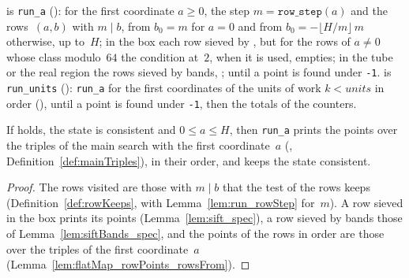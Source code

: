 \begin{definition}\label{def:runA}
  \leanok
   is \texttt{run\_a} (): for the first
  coordinate $a \ge 0$, the step $m = \texttt{row\_step}(a)$ and the rows~$(a, b)$ with $m \mid b$,
  from $b_0 = m$ for $a = 0$ and from $b_0 = -\lfloor H/m \rfloor\, m$ otherwise, up to~$H$; in the
  box each row sieved by , but for the rows of $a \ne 0$ whose class
  modulo~$64$ the condition at~$2$, when it is used, empties; in the tube or the real region the
  rows sieved by bands, ; until a point is found under \texttt{-1}.
   is \texttt{run\_units} ():
  \texttt{run\_a} for the first coordinates of the units of work $k < \mathit{units}$ in order
  (), until a point is found under \texttt{-1}, then the totals of the
  counters.
\end{definition}


\begin{lemma}\label{lem:runA_spec}
  \leanok
  If  holds, the state is consistent and $0 \le a \le H$, then
  \texttt{run\_a} prints the points over the triples of the main search with the first
  coordinate~$a$ (, Definition~\ref{def:mainTriples}), in their order,
  and keeps the state consistent.
\end{lemma}

\begin{proof}
  \leanok
  The rows visited are those with $m \mid b$ that the test of the rows keeps
  (Definition~\ref{def:rowKeeps}, with Lemma~\ref{lem:run_rowStep} for~$m$). A row sieved in the
  box prints its points (Lemma~\ref{lem:sift_spec}), a row sieved by bands those of
  Lemma~\ref{lem:siftBands_spec}, and the points of the rows in order are those over the triples of
  the first coordinate~$a$ (Lemma~\ref{lem:flatMap_rowPoints_rowsFrom}).
\end{proof}

